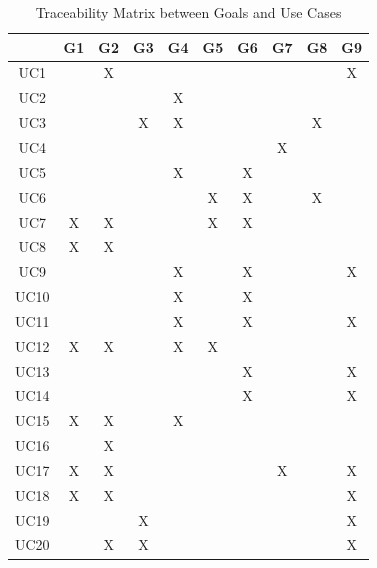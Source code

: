 \documentclass[12pt]{article}
\begin{document}
    \begin{table}[h!]
        \centering
        \begin{tabular}{|c|c|c|c|c|c|c|c|c|c|}
            \hline
            &     G1&G2&G3&G4&G5&G6&G7&G8&G9\\ \hline
            UC1  &  & X&  &  &  &  &  &  & X\\ \hline
            UC2  &  &  &  & X&  &  &  &  & \\ \hline
            UC3  &  &  & X& X&  &  &  & X& \\ \hline
            UC4  &  &  &  &  &  &  & X&  & \\ \hline
            UC5  &  &  &  & X&  & X&  &  & \\ \hline
            UC6  &  &  &  &  & X& X&  & X& \\ \hline
            UC7  & X& X&  &  & X& X&  &  & \\ \hline
            UC8  & X& X&  &  &  &  &  &  & \\ \hline
            UC9  &  &  &  & X&  & X&  &  & X\\ \hline
            UC10 &  &  &  & X&  & X&  &  & \\ \hline
            UC11 &  &  &  & X&  & X&  &  & X\\ \hline
            UC12 & X& X&  & X& X&  &  &  & \\ \hline
            UC13 &  &  &  &  &  & X&  &  & X\\ \hline
            UC14 &  &  &  &  &  & X&  &  & X\\ \hline
            UC15 & X& X&  & X&  &  &  &  & \\ \hline
            UC16 &  &  X& &  &  &  &  &  & \\ \hline
            UC17 &  X& X& &  &  &  & X&  & X\\ \hline
            UC18 &  X& X& &  &  &  &  &  & X\\ \hline
            UC19 &  &  & X&  &  &  &  &  & X\\ \hline
            UC20 &  & X& X&  &  &  &  &  & X\\ \hline
        \end{tabular}
        \caption{Traceability Matrix between Goals and Use Cases}
    \end{table}
\end{document}
